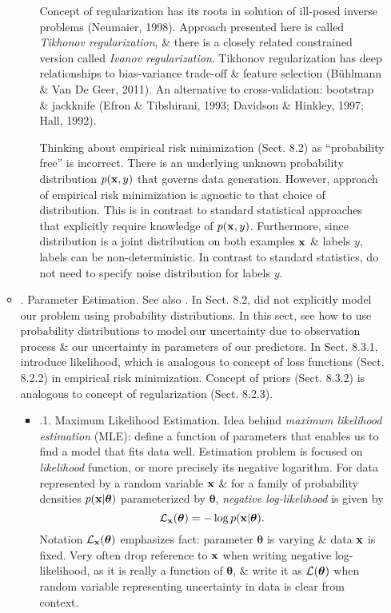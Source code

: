 \documentclass{article}
\begin{document}
\begin{itemize}
\begin{itemize}
\begin{itemize}
			Concept of regularization has its roots in solution of ill-posed inverse problems (Neumaier, 1998). Approach presented here is called {\it Tikhonov regularization}, \& there is a closely related constrained version called {\it Ivanov regularization}. Tikhonov regularization has deep relationships to bias-variance trade-off \& feature selection (Bühlmann \& Van De Geer, 2011). An alternative to cross-validation: bootstrap \& jackknife (Efron \& Tibshirani, 1993; Davidson \& Hinkley, 1997; Hall, 1992).
			
			Thinking about empirical risk minimization (Sect. 8.2) as ``probability free'' is incorrect. There is an underlying unknown probability distribution $p({\bf x},y)$ that governs data generation. However, approach of empirical risk minimization is agnostic to that choice of distribution. This is in contrast to standard statistical approaches that explicitly require knowledge of $p({\bf x},y)$. Furthermore, since distribution is a joint distribution on both examples ${\bf x}$ \& labels $y$, labels can be non-deterministic. In contrast to standard statistics, do not need to specify noise distribution for labels $y$.
		\end{itemize}		
		\item {. Parameter Estimation.} See also \cite{Aster_Borchers_Thurber2018}. In Sect. 8.2, did not explicitly model our problem using probability distributions. In this sect, see how to use probability distributions to model our uncertainty due to observation process \& our uncertainty in parameters of our predictors. In Sect. 8.3.1, introduce likelihood, which is analogous to concept of loss functions (Sect. 8.2.2)  in empirical risk minimization. Concept of priors (Sect. 8.3.2) is analogous to concept of regularization (Sect. 8.2.3).
		\begin{itemize}
			\item {.1. Maximum Likelihood Estimation.} Idea behind {\it maximum likelihood estimation} (MLE): define a function of parameters that enables us to find a model that fits data well. Estimation problem is focused on {\it likelihood} function, or more precisely its negative logarithm. For data represented by a random variable ${\bf x}$ \& for a family of probability densities $p({\bf x}|\boldsymbol{\theta})$ parameterized by $\boldsymbol{\theta}$, {\it negative log-likelihood} is given by
			\begin{equation}
				{\cal L}_{\bf x}(\boldsymbol{\theta}) = -\log p({\bf x}|\boldsymbol{\theta}).
			\end{equation}
			Notation ${\cal L}_{\bf x}(\boldsymbol{\theta})$ emphasizes fact: parameter $\boldsymbol{\theta}$ is varying \& data ${\bf x}$ is fixed. Very often drop reference to ${\bf x}$ when writing negative log-likelihood, as it is really a function of $\boldsymbol{\theta}$, \& write it as ${\cal L}(\boldsymbol{\theta})$ when random variable representing uncertainty in data is clear from context.
			

\end{itemize}
\end{itemize}
\end{itemize}
\end{document}
